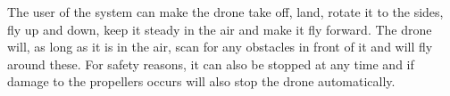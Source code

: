 \documentclass[Main]{subfiles}
\begin{document}
The user of the system can make the drone take off, land, rotate it to the sides, fly up and down, keep it steady in the air and make it fly forward.
The drone will, as long as it is in the air, scan for any obstacles in front of it and will fly around these.
For safety reasons, it can also be stopped at any time and if damage to the propellers occurs will also stop the drone automatically.
\end{document}
